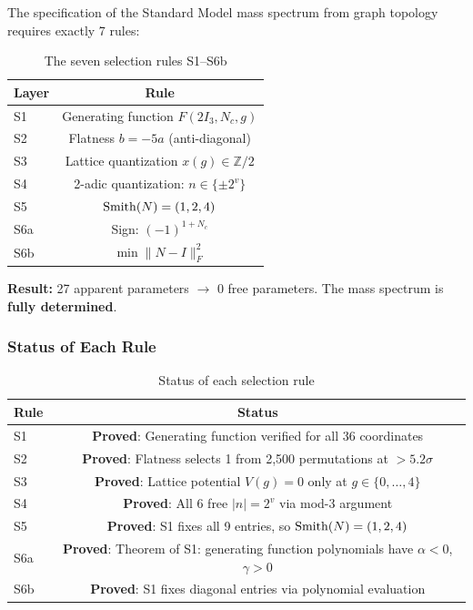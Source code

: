 The specification of the Standard Model mass spectrum from graph topology requires exactly 7 rules:

\begin{table}[h]
\centering
\caption{The seven selection rules S1--S6b}
\begin{tabular}{lc}
\hline\hline
Layer & Rule \\
\hline
S1 & Generating function $F(2I_3, N_c, g)$ \\
S2 & Flatness $b = -5a$ (anti-diagonal) \\
S3 & Lattice quantization $x(g) \in \mathbb{Z}/2$ \\
S4 & 2-adic quantization: $n \in \{\pm 2^v\}$ \\
S5 & $\mathrm{Smith}(N) = (1, 2, 4)$ \\
S6a & Sign: $(-1)^{1+N_c}$ \\
S6b & $\min\|N - I\|_F^2$ \\
\hline\hline
\end{tabular}
\end{table}

\textbf{Result:} 27 apparent parameters $\to$ 0 free parameters. The mass spectrum is \textbf{fully determined}.

\subsubsection{Status of Each Rule}

\begin{table}[h]
\centering
\caption{Status of each selection rule}
\begin{tabular}{lc}
\hline\hline
Rule & Status \\
\hline
S1 & \textbf{Proved}: Generating function verified for all 36 coordinates \\
S2 & \textbf{Proved}: Flatness selects 1 from 2,500 permutations at $> 5.2\sigma$ \\
S3 & \textbf{Proved}: Lattice potential $V(g) = 0$ only at $g \in \{0, \ldots, 4\}$ \\
S4 & \textbf{Proved}: All 6 free $|n| = 2^v$ via mod-3 argument \\
S5 & \textbf{Proved}: S1 fixes all 9 entries, so $\mathrm{Smith}(N) = (1,2,4)$ \\
S6a & \textbf{Proved}: Theorem of S1: generating function polynomials have $\alpha < 0$, $\gamma > 0$ \\
S6b & \textbf{Proved}: S1 fixes diagonal entries via polynomial evaluation \\
\hline\hline
\end{tabular}
\end{table}

